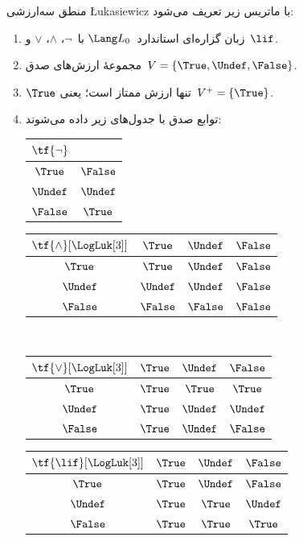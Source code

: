 \documentclass[../../../include/open-logic-section]{subfiles}
\begin{document}
\begin{defn}
منطق سه‌ارزشی \L ukasiewicz با ماتریس زیر تعریف می‌شود:
\begin{enumerate}
  \item زبان گزاره‌ای استاندارد~$\Lang L_0$ با~$\lnot$، $\land$،
  $\lor$ و~$\lif$.
  \item مجموعهٔ ارزش‌های صدق~$V = \{\True, \Undef, \False\}$.
  \item $\True$ تنها ارزش ممتاز است؛ یعنی~$V^+ = \{\True\}$.
  \item توابع صدق با جدول‌های زیر داده می‌شوند:
  \begin{center}
    \begin{tabular}{c|c} 
      $\tf{\lnot}$ & \\ 
      \hline  
      $\True$ & $\False$ \\ 
      $\Undef$ & $\Undef$ \\
      $\False$ & $\True$ 
    \end{tabular}
    \quad
    \begin{tabular}{c|ccc} 
      $\tf{\land}[\LogLuk[3]]$ & $\True$ & $\Undef$ & $\False$ \\ 
      \hline 
      $\True$ & $\True$ & $\Undef$ & $\False$ \\ 
      $\Undef$ & $\Undef$ & $\Undef$ & $\False$\\ 
      $\False$ & $\False$ & $\False$ & $\False$ 
    \end{tabular}
    \\[2ex]
    \begin{tabular}{c|ccc} 
      $\tf{\lor}[\LogLuk[3]]$ & $\True$ & $\Undef$ & $\False$ \\ 
      \hline 
      $\True$ & $\True$ & $\True$ & $\True$ \\ 
      $\Undef$ & $\True$ & $\Undef$ & $\Undef$ \\
      $\False$ & $\True$ & $\Undef$ & $\False$ 
    \end{tabular}
    \quad
    \begin{tabular}{c|ccc} 
      $\tf{\lif}[\LogLuk[3]]$ & $\True$ & $\Undef$ & $\False$ \\ 
      \hline 
      $\True$ & $\True$ & $\Undef$ & $\False$ \\ 
      $\Undef$ & $\True$ & $\True$ & $\Undef$  \\ 
      $\False$ & $\True$ & $\True$ & $\True$ 
    \end{tabular}
  \end{center} 
\end{enumerate}
\end{defn}
\end{document}
